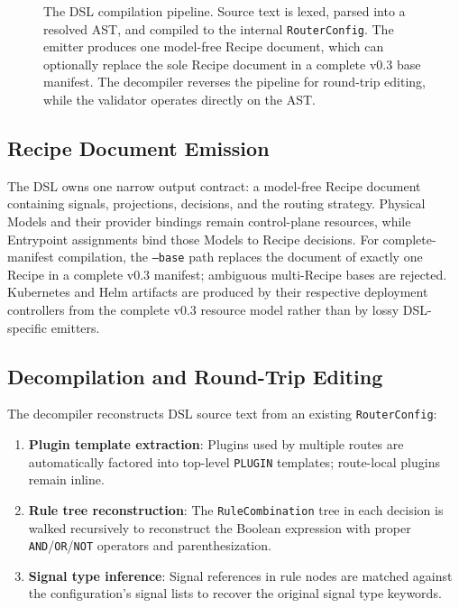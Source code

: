 \begin{figure}[!ht]
{%
}
  \caption{The DSL compilation pipeline. Source text is lexed, parsed into a resolved AST, and compiled to the internal \texttt{RouterConfig}. The emitter produces one model-free Recipe document, which can optionally replace the sole Recipe document in a complete v0.3 base manifest. The decompiler reverses the pipeline for round-trip editing, while the validator operates directly on the AST.}
  \label{fig:dsl_pipeline}
\end{figure}

\subsection{Recipe Document Emission}
\label{sec:dsl_emission}

The DSL owns one narrow output contract: a model-free Recipe document containing signals, projections, decisions, and the routing strategy. Physical Models and their provider bindings remain control-plane resources, while Entrypoint assignments bind those Models to Recipe decisions. For complete-manifest compilation, the \texttt{--base} path replaces the document of exactly one Recipe in a complete v0.3 manifest; ambiguous multi-Recipe bases are rejected. Kubernetes and Helm artifacts are produced by their respective deployment controllers from the complete v0.3 resource model rather than by lossy DSL-specific emitters.

\subsection{Decompilation and Round-Trip Editing}
\label{sec:dsl_decompile}

The decompiler reconstructs DSL source text from an existing \texttt{RouterConfig}:

\begin{enumerate}
  \item \textbf{Plugin template extraction}: Plugins used by multiple routes are automatically factored into top-level \texttt{PLUGIN} templates; route-local plugins remain inline.
  \item \textbf{Rule tree reconstruction}: The \texttt{RuleCombination} tree in each decision is walked recursively to reconstruct the Boolean expression with proper \texttt{AND}/\texttt{OR}/\texttt{NOT} operators and parenthesization.
  \item \textbf{Signal type inference}: Signal references in rule nodes are matched against the configuration's signal lists to recover the original signal type keywords.
\end{enumerate}

